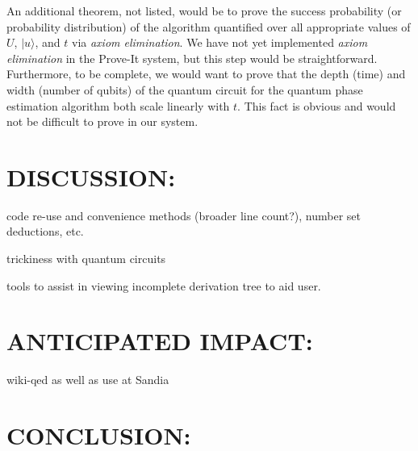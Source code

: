 \documentclass{article}[12pt]
\begin{document}
An additional theorem, not listed, would be to prove the success probability (or probability distribution) of the algorithm quantified over all appropriate values of $U$, $\lvert u \rangle$, and $t$ via {\em axiom elimination}.  We have not yet implemented {\em axiom elimination} in the Prove-It system, but this step would be straightforward.  Furthermore, to be complete, we would want to prove that the depth (time) and width (number of qubits) of the quantum circuit for the quantum phase estimation algorithm both scale linearly with $t$.  This fact is obvious and would not be difficult to prove in our system.

\section*{DISCUSSION:}
code re-use and convenience methods (broader line count?), number set deductions, etc.

trickiness with quantum circuits

tools to assist in viewing incomplete derivation tree to aid user.

\section*{ANTICIPATED IMPACT:}
wiki-qed as well as use at Sandia

\section*{CONCLUSION:}
\end{document}
